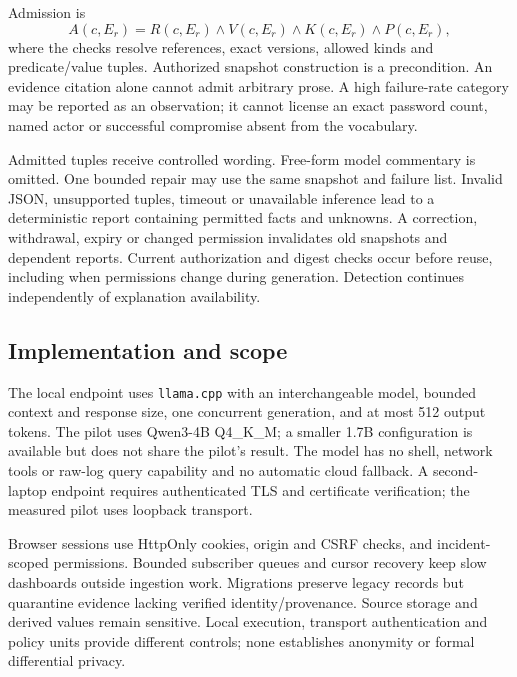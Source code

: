 \documentclass[conference,letterpaper]{IEEEtran}
\begin{document}
Admission is
\begin{equation}
A(c,E_r)=R(c,E_r)\land V(c,E_r)\land K(c,E_r)\land P(c,E_r),
\label{eq:admit}
\end{equation}
where the checks resolve references, exact versions, allowed kinds and predicate/value tuples. Authorized snapshot construction is a precondition. An evidence citation alone cannot admit arbitrary prose. A high failure-rate category may be reported as an observation; it cannot license an exact password count, named actor or successful compromise absent from the vocabulary.

Admitted tuples receive controlled wording. Free-form model commentary is omitted. One bounded repair may use the same snapshot and failure list. Invalid JSON, unsupported tuples, timeout or unavailable inference lead to a deterministic report containing permitted facts and unknowns. A correction, withdrawal, expiry or changed permission invalidates old snapshots and dependent reports. Current authorization and digest checks occur before reuse, including when permissions change during generation. Detection continues independently of explanation availability.

\subsection{Implementation and scope}
The local endpoint uses \texttt{llama.cpp} with an interchangeable model, bounded context and response size, one concurrent generation, and at most 512 output tokens. The pilot uses Qwen3-4B Q4\_K\_M; a smaller 1.7B configuration is available but does not share the pilot's result. The model has no shell, network tools or raw-log query capability and no automatic cloud fallback. A second-laptop endpoint requires authenticated TLS and certificate verification; the measured pilot uses loopback transport.

Browser sessions use HttpOnly cookies, origin and CSRF checks, and incident-scoped permissions. Bounded subscriber queues and cursor recovery keep slow dashboards outside ingestion work. Migrations preserve legacy records but quarantine evidence lacking verified identity/provenance. Source storage and derived values remain sensitive. Local execution, transport authentication and policy units provide different controls; none establishes anonymity or formal differential privacy.
\end{document}
